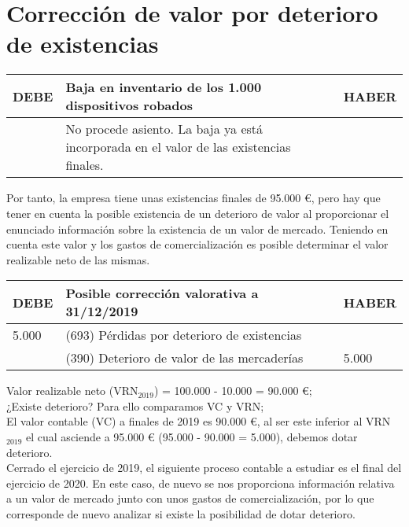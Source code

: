 \documentclass{article}
\begin{document}
\section*{Corrección de valor por deterioro de existencias}

\begin{table}[H]
    \centering
    \begin{tabular}{|p{4cm}|p{4cm}|p{4cm}|}
        \hline
        \textbf{DEBE} & \textbf{Baja en inventario de los 1.000 dispositivos robados} & \textbf{HABER} \\
        \hline
        & No procede asiento. La baja ya está incorporada en el valor de las existencias finales. & \\
        \hline
    \end{tabular}
\end{table}

Por tanto, la empresa tiene unas existencias finales de 95.000 €, pero hay que tener en cuenta la posible existencia de un deterioro de valor al proporcionar el enunciado información sobre la existencia de un valor de mercado. Teniendo en cuenta este valor y los gastos de comercialización es posible determinar el valor realizable neto de las mismas.

\begin{table}[H]
\centering
\begin{tabular}{|l|l|l|}
\hline
\textbf{DEBE} & \textbf{Posible corrección valorativa a 31/12/2019} & \textbf{HABER} \\
\hline
5.000 & (693) Pérdidas por deterioro de existencias & \\
 & (390) Deterioro de valor de las mercaderías & 5.000 \\
\hline
\end{tabular}
\end{table}

Valor realizable neto (VRN\(_{2019}\)) = 100.000 - 10.000 = 90.000 €; \\
¿Existe deterioro? Para ello comparamos VC y VRN; \\
El valor contable (VC) a finales de 2019 es 90.000 €, al ser este inferior al VRN\(_{2019}\) el cual asciende a 95.000 € (95.000 - 90.000 = 5.000), debemos dotar deterioro. \\

Cerrado el ejercicio de 2019, el siguiente proceso contable a estudiar es el final del ejercicio de 2020. En este caso, de nuevo se nos proporciona información relativa a un valor de mercado junto con unos gastos de comercialización, por lo que corresponde de nuevo analizar si existe la posibilidad de dotar deterioro.
\end{document}
